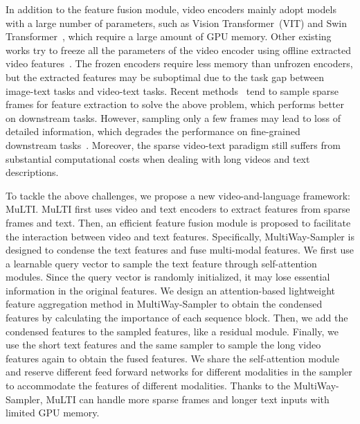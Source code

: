 \documentclass[10pt,twocolumn,letterpaper]{article}
\begin{document}
In addition to the feature fusion module, video encoders mainly adopt models with a large number of parameters, such as Vision Transformer~(VIT) \cite{Dosovitskiy2021AnII} and Swin Transformer~\cite{Liu2021SwinTH}, which require a large amount of GPU memory.
Other existing works try to freeze all the parameters of the video encoder using offline extracted video features~\cite{Miech2019HowTo100MLA,Sun2019VideoBERTAJ,Li2020HeroHE,Zhu2020ActBERTLG,Miech2020EndtoEndLO,Luo2020Univl}.
The frozen encoders require less memory than unfrozen encoders, but the extracted features may be suboptimal due to the task gap between image-text tasks and video-text tasks.
Recent methods~\cite{Fu2021VIOLETE, Huang2022CloverTA,Lei2021Less,Li2021AlignAP,Yang2022ZeroShotVQ,Lei2021UnderstandingCV} tend to sample sparse frames for feature extraction to solve the above problem, which performs better on downstream tasks.
However, sampling only a few frames may lead to loss of detailed information, which degrades the performance on fine-grained downstream tasks~\cite{Lei2022RevealingSF}. 
Moreover, the sparse video-text paradigm still suffers from substantial computational costs when dealing with long videos and text descriptions. 


To tackle the above challenges, we propose a new video-and-language framework: MuLTI.
MuLTI first uses video and text encoders to extract features from sparse frames and text. 
Then, an efficient feature fusion module is proposed to facilitate the interaction between video and text features. 
Specifically, MultiWay-Sampler is designed to condense the text features and fuse multi-modal features. 
We first use a learnable query vector to sample the text feature through self-attention modules. 
Since the query vector is randomly initialized, it may lose essential information in the original features.
We design an attention-based lightweight feature aggregation method in MultiWay-Sampler to obtain the condensed features by calculating the importance of each sequence block. 
Then, we add the condensed features to the sampled features, like a residual module.
Finally, we use the short text features and the same sampler to sample the long video features again to obtain the fused features. 
We share the self-attention module and reserve different feed forward networks for different modalities in the sampler to accommodate the features of different modalities. 
Thanks to the MultiWay-Sampler, MuLTI can handle more sparse frames and longer text inputs with limited GPU memory. 
\end{document}
